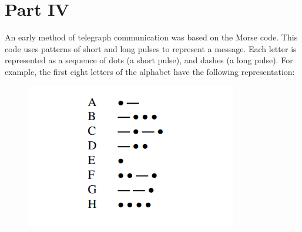 
\section{Part IV}
An early method of telegraph communication was based on the Morse code. This code uses patterns of short and long pulses to represent a message. Each letter is represented as a sequence of dots (a short pulse), and dashes (a long pulse). For example, the first eight letters of the alphabet have the following representation:
\begin{figure}[h]
    \centering
    \includegraphics[scale = 0.80]{source/picture/Lab5/Lab5_1.png}
\end{figure}\\
